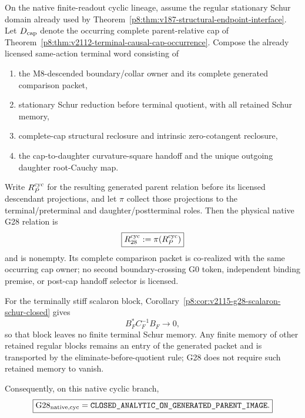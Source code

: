 \documentclass[12pt,a4paper]{article}
\begin{document}
\begin{theorem}
\label{p8:thm:v2122-native-cyclic-g28-closure}
On the native finite-readout cyclic lineage, assume the regular stationary
Schur domain already used by
Theorem~\ref{p8:thm:v187-structural-endpoint-interface}.  Let
$D_{\rm cap}$ denote the occurring complete parent-relative cap of
Theorem~\ref{p8:thm:v2112-terminal-causal-cap-occurrence}.  Compose the
already licensed same-action terminal word consisting of
\begin{enumerate}[label=(\roman*),leftmargin=2em]
\item the M8-descended boundary/collar owner and its complete generated
      comparison packet,
\item stationary Schur reduction before terminal quotient, with all retained
      Schur memory,
\item complete-cap structural reclosure and intrinsic zero-cotangent
      reclosure,
\item the cap-to-daughter curvature-square handoff and the unique outgoing
      daughter root-Cauchy map.
\end{enumerate}
Write $R_P^{\rm cyc}$ for the resulting generated parent relation before its
licensed descendant projections, and let $\pi$ collect those projections to
the terminal/preterminal and daughter/postterminal roles.  Then the physical
native G28 relation is
\begin{equation}
\label{p8:eq:v2122-g28-parent-image}
 \boxed{
 R_{28}^{\rm cyc}:=\pi(R_P^{\rm cyc})
 }
\end{equation}
and is nonempty.  Its complete comparison packet is co-realized with the same
occurring cap owner; no second boundary-crossing G0 token, independent binding
premise, or post-cap handoff selector is licensed.

For the terminally stiff scalaron block,
Corollary~\ref{p8:cor:v2115-g28-scalaron-schur-closed} gives
\[
 B_F^*C_F^{-1}B_F\longrightarrow0,
\]
so that block leaves no finite terminal Schur memory.  Any finite memory of
other retained regular blocks remains an entry of the generated packet and is
transported by the eliminate-before-quotient rule; G28 does not require such
retained memory to vanish.

Consequently, on this native cyclic branch,
\begin{equation}
\label{p8:eq:v2122-g28-status}
 \boxed{
 \mathrm{G28}_{\rm native,cyc}
 =\texttt{CLOSED\_ANALYTIC\_ON\_GENERATED\_PARENT\_IMAGE}.}
\end{equation}
\end{theorem}
\end{document}
